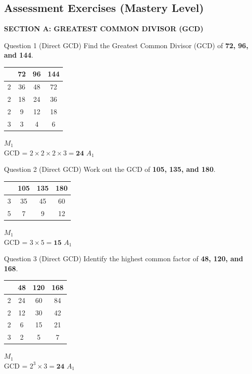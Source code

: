 \documentclass[12pt, a4paper, oneside]{article}
\begin{document}
\subsection*{Assessment Exercises (Mastery Level)}

\begin{center}
    \textbf{\color{strandcolor} SECTION A: GREATEST COMMON DIVISOR (GCD)}
\end{center}

\begin{solvingbox}{Question 1 (Direct GCD)}
Find the Greatest Common Divisor (GCD) of \textbf{72, 96, and 144}. \\
\begin{tabular}{|c|c|c|c|} \hline
    & \textbf{72} & \textbf{96} & \textbf{144} \\ \hline
    2 & 36 & 48 & 72 \\ \hline
    2 & 18 & 24 & 36 \\ \hline
    2 & 9 & 12 & 18 \\ \hline
    3 & 3 & 4 & 6 \\ \hline
\end{tabular} \hfill $M_1$ \\
GCD = $2 \times 2 \times 2 \times 3 = \mathbf{24}$ \hfill $A_1$
\end{solvingbox}

\begin{solvingbox}{Question 2 (Direct GCD)}
Work out the GCD of \textbf{105, 135, and 180}. \\
\begin{tabular}{|c|c|c|c|} \hline
    & \textbf{105} & \textbf{135} & \textbf{180} \\ \hline
    3 & 35 & 45 & 60 \\ \hline
    5 & 7 & 9 & 12 \\ \hline
\end{tabular} \hfill $M_1$ \\
GCD = $3 \times 5 = \mathbf{15}$ \hfill $A_1$
\end{solvingbox}

\begin{solvingbox}{Question 3 (Direct GCD)}
Identify the highest common factor of \textbf{48, 120, and 168}. \\
\begin{tabular}{|c|c|c|c|} \hline
    & \textbf{48} & \textbf{120} & \textbf{168} \\ \hline
    2 & 24 & 60 & 84 \\ \hline
    2 & 12 & 30 & 42 \\ \hline
    2 & 6 & 15 & 21 \\ \hline
    3 & 2 & 5 & 7 \\ \hline
\end{tabular} \hfill $M_1$ \\
GCD = $2^3 \times 3 = \mathbf{24}$ \hfill $A_1$
\end{solvingbox}
\end{document}
